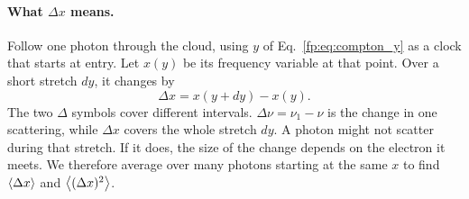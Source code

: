 \paragraph{What $\Delta x$ means.} Follow one photon through the cloud, using $y$ of Eq.~\eqref{fp:eq:compton_y} as a clock that starts at entry. Let $x(y)$ be its frequency variable at that point. Over a short stretch $dy$, it changes by
\begin{equation}
	\Delta x=x(y+dy)-x(y) .
	\label{fp:eq:delta_x}
\end{equation}
The two $\Delta$ symbols cover different intervals. $\Delta\nu=\nu_1-\nu$ is the change in one scattering, while $\Delta x$ covers the whole stretch $dy$. A photon might not scatter during that stretch. If it does, the size of the change depends on the electron it meets. We therefore average over many photons starting at the same $x$ to find $\left\langle \Delta x\right\rangle$ and $\left\langle (\Delta x)^2\right\rangle$.

